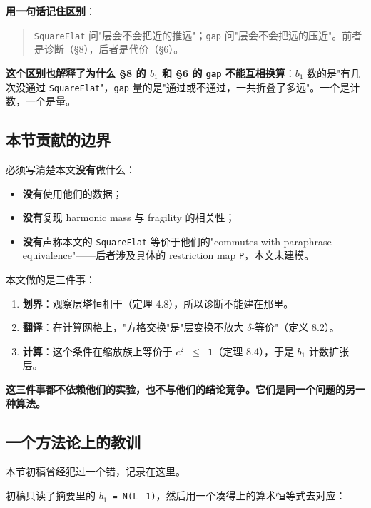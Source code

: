 \documentclass[11pt,a4paper]{ctexart}
\begin{document}
\textbf{用一句话记住区别}：

\begin{quote}
\texttt{SquareFlat} 问"层会不会把近的推远"；\texttt{gap} 问"层会不会把远的压近"。前者是诊断（§8），后者是代价（§6）。
\end{quote}

\textbf{这个区别也解释了为什么 §8 的 \texttt{\ensuremath{b_{1}}} 和 §6 的 \texttt{gap} 不能互相换算}：\texttt{\ensuremath{b_{1}}} 数的是"有几次没通过 \texttt{SquareFlat}"，\texttt{gap} 量的是"通过或不通过，一共折叠了多远"。一个是计数，一个是量。

\subsection{本节贡献的边界}

必须写清楚本文\textbf{没有}做什么：

\begin{itemize}
\item \textbf{没有}使用他们的数据；
\item \textbf{没有}复现 harmonic mass 与 fragility 的相关性；
\item \textbf{没有}声称本文的 \texttt{SquareFlat} 等价于他们的"commutes with paraphrase equivalence"——后者涉及具体的 restriction map \texttt{P}，本文未建模。
\end{itemize}

本文做的是三件事：

\begin{enumerate}
\item \textbf{划界}：观察层塔恒相干（定理 4.8），所以诊断不能建在那里。
\item \textbf{翻译}：在计算网格上，"方格交换"是"层变换不放大 \ensuremath{\delta}-等价"（定义 8.2）。
\item \textbf{计算}：这个条件在缩放族上等价于 \texttt{\ensuremath{c^{2}} \ensuremath{\le} 1}（定理 8.4），于是 \texttt{\ensuremath{b_{1}}} 计数扩张层。
\end{enumerate}

\textbf{这三件事都不依赖他们的实验，也不与他们的结论竞争。它们是同一个问题的另一种算法。}

\subsection{一个方法论上的教训}

本节初稿曾经犯过一个错，记录在这里。

初稿只读了摘要里的 \texttt{\ensuremath{b_{1}} = N(L\ensuremath{-}1)}，然后用一个凑得上的算术恒等式去对应：
\end{document}
